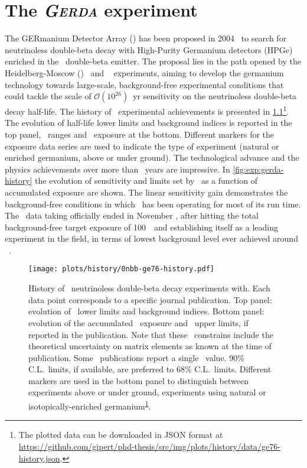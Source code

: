 
\chapter[The \gerda\ experiment]{The \textit{\textsc{Gerda}} experiment}\label{chap:gerda}

The GERmanium Detector Array (\gerda) has been proposed in 2004~\cite{gerda-proposal} to
search for neutrinoless double-beta decay with High-Purity Germanium detectors (HPGe)
enriched in the \gesix\ double-beta emitter. The proposal lies in the path opened by the
Heidelberg-Moscow (\hdm)~\cite{Klapdor2001} and \igex~\cite{Aalseth2002} experiments,
aiming to develop the germanium technology towards large-scale, background-free
experimental conditions that could tackle the scale of $\mathcal{O}(10^{26})$~yr
sensitivity on the neutrinoless double-beta decay half-life. The history of \gesix\
experimental achievements is presented in
\cref{img:exp:ge76-history}\footnote{\label{footnote:ge76-hist-json}%
  The plotted data can be downloaded in JSON format at
  \url{https://github.com/gipert/phd-thesis/src/img/plots/history/data/ge76-history.json}.
}. The evolution of half-life lower limits and background indices is reported in the top
panel, \mbb\ ranges and \gesix\ exposure at the bottom.  Different markers for the exposure
data series are used to indicate the type of experiment (natural or enriched germanium,
above or under ground).  The technological advance and the physics achievements over more
than \yr{50}~years are impressive. In \cref{fig:exp:gerda-history} the evolution of
sensitivity and limits set by \gerda\ as a function of accumulated exposure are shown. The
linear sensitivity gain demonstrates the background-free conditions in which \gerda\ has
been operating for most of its run time. The \gerda\ data taking officially ended in
November \yr{2019}, after hitting the total background-free target exposure of 100~\kgyr\
and establishing itself as a leading experiment in the field, in terms of lowest
background level ever achieved around \qbb~\cite{Kermaidic2020, Agostini2021}.

\begin{figure}
  \centering
  \texttt{[image: plots/history/0nbb-ge76-history.pdf]}
  \caption[placeholder]{%
    History of \gesix\ neutrinoless double-beta decay experiments with. Each data point
    corresponds to a specific journal publication. Top panel: evolution of \thalfzero\
    lower limits and background indices. Bottom panel: evolution of the accumulated
    \gesix\ exposure and \mbb\ upper limits, if reported in the publication. Note that
    these \mbb\ constrains include the theoretical uncertainty on matrix elements as known
    at the time of publication. Some \hdm\ publications report a single \mbb\ value. 90\%
    C.L.~limits, if available, are preferred to 68\% C.L.~limits. Different markers are
    used in the bottom panel to distinguish between experiments above or under ground,
    experiments using natural or isotopically-enriched
    germanium\textsuperscript{\ref{footnote:ge76-hist-json}}.
  }\label{img:exp:ge76-history}
\end{figure}

